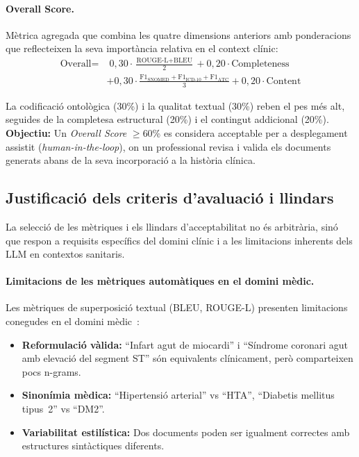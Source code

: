 \documentclass[CAT]{TFUOC}%
\begin{document}
\paragraph{Overall Score.}
Mètrica agregada que combina les quatre dimensions anteriors amb ponderacions que reflecteixen la seva importància relativa en el context clínic:
\begin{equation*}
\begin{split}
\text{Overall} = & \; 0{,}30 \cdot \frac{\text{ROUGE-L}+\text{BLEU}}{2} + 0{,}20 \cdot \text{Completeness} \\
& + 0{,}30 \cdot \frac{\text{F1}_\text{SNOMED}+\text{F1}_\text{ICD-10}+\text{F1}_\text{ATC}}{3} + 0{,}20 \cdot \text{Content}
\end{split}
\end{equation*}

La codificació ontològica (30\%) i la qualitat textual (30\%) reben el pes més alt, seguides de la completesa estructural (20\%) i el contingut addicional (20\%). \textbf{Objectiu:} Un \textit{Overall Score} $\geq$60\% es considera acceptable per a desplegament assistit (\textit{human-in-the-loop}), on un professional revisa i valida els documents generats abans de la seva incorporació a la història clínica.

\subsection{Justificació dels criteris d'avaluació i llindars}

La selecció de les mètriques i els llindars d'acceptabilitat no és arbitrària, sinó que respon a requisits específics del domini clínic i a les limitacions inherents dels LLM en contextos sanitaris.

\paragraph{Limitacions de les mètriques automàtiques en el domini mèdic.}
Les mètriques de superposició textual (BLEU, ROUGE-L) presenten limitacions conegudes en el domini mèdic~\cite{chua2024discharge}:
\begin{itemize}
    \item \textbf{Reformulació vàlida:} ``Infart agut de miocardi'' i ``Síndrome coronari agut amb elevació del segment ST'' són equivalents clínicament, però comparteixen pocs n-grams.
    \item \textbf{Sinonímia mèdica:} ``Hipertensió arterial'' vs ``HTA'', ``Diabetis mellitus tipus~2'' vs ``DM2''.
    \item \textbf{Variabilitat estilística:} Dos documents poden ser igualment correctes amb estructures sintàctiques diferents.
\end{itemize}
\end{document}
